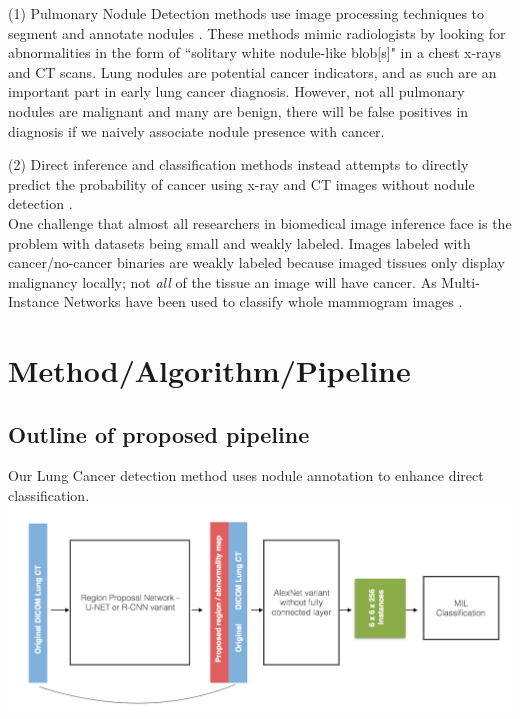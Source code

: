 \documentclass[twocolumn,10pt]{article}
\newcommand{\red}[1]{{\color{red}#1}}
\newcommand{\temp}[1]{{\red{#1}\\}}
\begin{document}
(1) Pulmonary Nodule Detection methods use 
image processing techniques to segment and annotate nodules
\cite{FeatureBasedLungNoduleDetection_2017, 
     LungNoduleDetectionWeaklyLabeled_2016, U-net_2015}. These methods
mimic radiologists by looking for abnormalities in the form of
``solitary white nodule-like blob[s]" in a chest x-rays and CT scans.
Lung nodules are potential cancer indicators, and as such are an important part 
in early lung cancer diagnosis. However, not all pulmonary nodules are malignant
and many are benign, there will be false positives in diagnosis if we naively
associate nodule presence with cancer. 

(2) Direct inference and classification methods
instead attempts to directly predict the probability of cancer using x-ray and
CT images without nodule detection
\cite{Kuruvilla_2013, classificationOfNodules_2016}. \\

One challenge that almost all researchers in biomedical image inference face is 
the problem with datasets being small and weakly labeled. Images labeled with
cancer/no-cancer binaries are weakly labeled because imaged tissues only display
malignancy locally; not \textit{all} of the tissue an image will have cancer. As
Multi-Instance Networks have been used to classify whole mammogram images
\cite{Maron:1998:FML:302528.302753}.

\section{Method/Algorithm/Pipeline}


\subsection{Outline of proposed pipeline}
Our Lung Cancer detection method uses nodule annotation to enhance direct
classification. 
\includegraphics[width=\columnwidth]{img/architecture.png}
\end{document}
